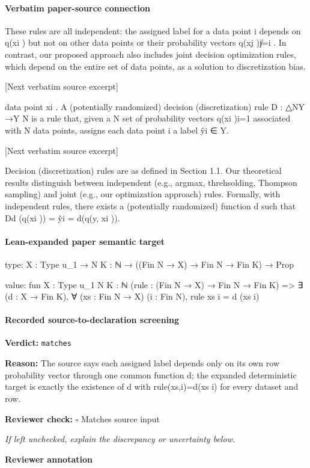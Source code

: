 \documentclass[10pt]{article}
\newcommand{\reviewerbox}{%
  \par\noindent\fbox{\parbox{0.96\linewidth}{\rule{0pt}{0.38in}}}\par
}
\newcommand{\reviewmatch}[1]{%
  \par\noindent\textbf{Reviewer check:} $\square$\; #1\par
  \noindent\emph{If left unchecked, explain the discrepancy or uncertainty below.}\par
}
\begin{document}
\paragraph{Verbatim paper-source connection}
\begin{ReviewVerbatim}
These rules are all independent: the assigned label for a data point i depends on q(xi ) but not on other
data points or their probability vectors {q(xj )}j̸=i .
    In contrast, our proposed approach also includes joint decision optimization rules, which depend on the
entire set of data points, as a solution to discretization bias.

[Next verbatim source excerpt]

data point xi . A (potentially randomized) decision (discretization) rule D : △NY →Y
                                                                                      N
                                                                                         is a rule that, given a
                                   N
set of probability vectors {q(xi )}i=1 associated with N data points, assigns each data point i a label ŷi ∈ Y.

[Next verbatim source excerpt]

    Decision (discretization) rules are as defined in Section 1.1. Our theoretical results distinguish between
independent (e.g., argmax, threhsolding, Thompson sampling) and joint (e.g., our optimization approach)
rules. Formally, with independent rules, there exists a (potentially randomized) function d such that
Dd ({q(xi )}) = {ŷi = d(q(y, xi ))}.
\end{ReviewVerbatim}



\paragraph{Lean-expanded paper semantic target}
\begin{ReviewVerbatim}
type:
{X : Type u_1} → {N K : ℕ} → ((Fin N → X) → Fin N → Fin K) → Prop

value:
fun {X : Type u_1} {N K : ℕ} (rule : (Fin N → X) → Fin N → Fin K) =>
  ∃ (d : X → Fin K), ∀ (xs : Fin N → X) (i : Fin N), rule xs i = d (xs i)
\end{ReviewVerbatim}


\paragraph{Recorded source-to-declaration screening}
\textbf{Verdict:} \texttt{matches}
\\
{\raggedright
\textbf{Reason:} The source says each assigned label depends only on its own row probability vector through one common function d;\allowbreak{} the expanded deterministic target is exactly the existence of d with rule(xs,i)=d(xs i) for every dataset and row.\allowbreak{}
\par}
\reviewmatch{Matches source input}
\noindent\textbf{Reviewer annotation}\par
\reviewerbox
\clearpage
\hypertarget{paper-prerequisite-29d817bb87f95d82}{}
\end{document}
